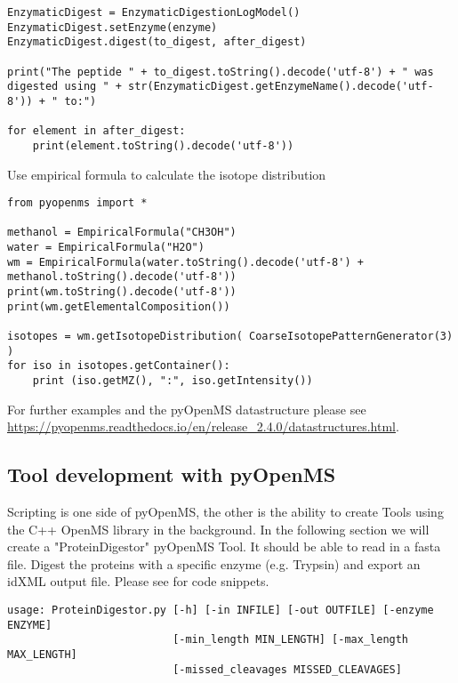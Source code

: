 {\begin{listing}
\begin{verbatim}
EnzymaticDigest = EnzymaticDigestionLogModel()
EnzymaticDigest.setEnzyme(enzyme)
EnzymaticDigest.digest(to_digest, after_digest)

print("The peptide " + to_digest.toString().decode('utf-8') + " was digested using " + str(EnzymaticDigest.getEnzymeName().decode('utf-8')) + " to:")

for element in after_digest:
    print(element.toString().decode('utf-8'))
\end{verbatim}
\end{listing}

\noindent Use empirical formula to calculate the isotope distribution 
\begin{listing}
\begin{verbatim}
from pyopenms import *

methanol = EmpiricalFormula("CH3OH")
water = EmpiricalFormula("H2O")
wm = EmpiricalFormula(water.toString().decode('utf-8') + methanol.toString().decode('utf-8'))
print(wm.toString().decode('utf-8'))
print(wm.getElementalComposition())

isotopes = wm.getIsotopeDistribution( CoarseIsotopePatternGenerator(3) )
for iso in isotopes.getContainer():
    print (iso.getMZ(), ":", iso.getIntensity())
\end{verbatim}
\end{listing}

\noindent For further examples and the pyOpenMS datastructure please see \url{https://pyopenms.readthedocs.io/en/release_2.4.0/datastructures.html}. 

\subsection{Tool development with pyOpenMS}
Scripting is one side of pyOpenMS, the other is the ability to create Tools using the C++ OpenMS library in the background.  In the following section we will create a "ProteinDigestor" pyOpenMS Tool. It should be able to read in a fasta file. Digest the proteins with a specific enzyme (e.g. Trypsin) and export an idXML output file. Please see   for code snippets.

\begin{listing}
\begin{verbatim}
usage: ProteinDigestor.py [-h] [-in INFILE] [-out OUTFILE] [-enzyme ENZYME]
                          [-min_length MIN_LENGTH] [-max_length MAX_LENGTH]
                          [-missed_cleavages MISSED_CLEAVAGES]


\end{verbatim}
\end{listing}}
